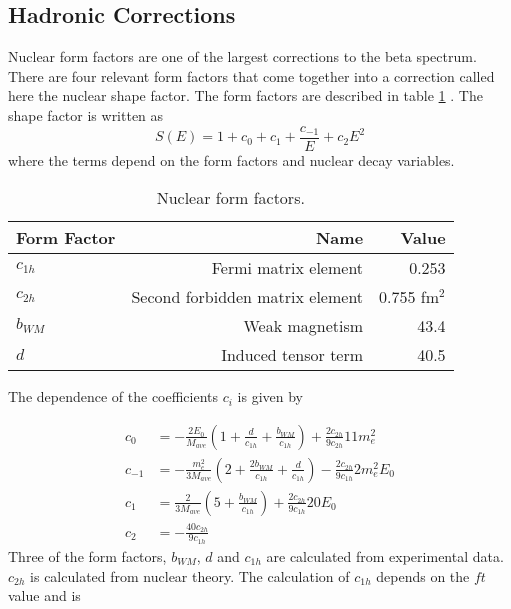 \documentclass[../MaxHughesThesis.tex]{subfiles}
\begin{document}
\subsection{Hadronic Corrections}

Nuclear form factors are one of the largest corrections to the beta spectrum.
There are four relevant form factors that come together into a correction called here the nuclear shape factor.
The form factors are described in table \ref{tab:formfact} \cite{Min11} \cite{Cal77}.
The shape factor is written as 
\begin{equation}
	\label{eq:shapefactor}
	S(E) = 1 + c_{0} + c_{1} + \frac{c_{-1}}{E} + c_{2}E^{2}	
\end{equation}
where the terms depend on the form factors and nuclear decay variables.
\begin{table}[!hbt]
	\centering
	\caption{Nuclear form factors.}
		\begin{tabular}{lrr}
		Form Factor & Name & Value \\ \hline
		$c_{1h}$ & Fermi matrix element & 0.253  \\
		$c_{2h}$ & Second forbidden matrix element & 0.755 fm$^{2}$  \\
		$b_{WM}$ & Weak magnetism & 43.4   \\
		$d$ & Induced tensor term & 40.5 
		\end{tabular}
	\label{tab:formfact}
\end{table}
The dependence of the coefficients $c_{i}$ is given by\cite{Cal77}

\begin{equation}
	\label{eq:sfcs}
	\begin{split}
	c_{0} & = -\frac{2 E_{0}}{M_{ave}}(1 + \frac{d}{c_{1h}} + \frac{b_{WM}}{c_{1h}})  + \frac{2 c_{2h}}{9 c_{2h}} 11 m_{e}^{2} \\
	c_{-1} & = -\frac{m_{e}^{2}}{3M_{ave}} (2 + \frac{2b_{WM}}{c_{1h}} + \frac{d}{c_{1h}})  - \frac{2 c_{2h}}{9 c_{1h}} 2 m_{e}^{2} E_{0}\\
	c_{1} & =  \frac{2}{3M_{ave}} (5 + \frac{b_{WM}}{c_{1h}}) + \frac{2 c_{2h}}{9 c_{1h}} 20 E_{0} \\
	c_{2} & = -\frac{40 c_{2h}}{9 c_{1h}} 
	\end{split}
\end{equation}
Three of the form factors, $b_{WM}$, $d$ and $c_{1h}$ are calculated from experimental data. 
$c_{2h}$ is calculated from nuclear theory. 
The calculation of $c_{1h}$ depends on the $ft$ value and is \cite{Min11}
\end{document}
